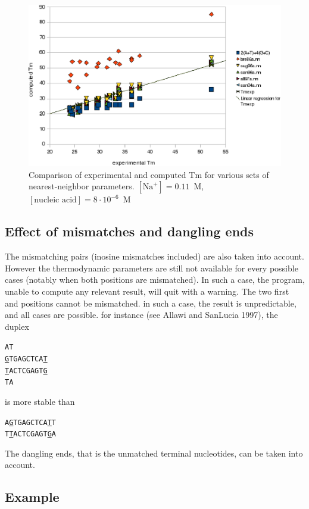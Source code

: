 \documentclass{article}
\begin{document}
\begin{figure}[h]
\includegraphics{image0_11M.eps}
\caption{Comparison of experimental and computed Tm for various sets of
  nearest-neighbor parameters. $[\mbox{Na}^+] = 0.11$~M, $[\mbox{nucleic acid}] = 8\cdot{}10^{-6}$~M}
\end{figure}
   
\subsection{Effect of mismatches and dangling ends}  

The mismatching pairs (inosine  mismatches  included) are also taken into account. However the thermodynamic
parameters are still not available for every possible cases (notably when both
positions are mismatched). In such a case, the program, unable to compute any
relevant result, will quit with a warning.  The two first and positions cannot
be mismatched. in such a case, the result is unpredictable, and all cases are
possible. for instance (see Allawi and SanLucia 1997), the duplex
\begin{alltt}
A          T  
 \underline{G}TGAGCTCA\underline{T}  
 \underline{T}ACTCGAGT\underline{G}  
T          A   
\end{alltt}

is more stable than 

\begin{alltt}
A\underline{G}TGAGCTCA\underline{T}T 
T\underline{T}ACTCGAGT\underline{G}A 
\end{alltt}
   
The dangling ends, that is the unmatched terminal nucleotides, can be taken into
account.

\subsection{Example}
\end{document}
